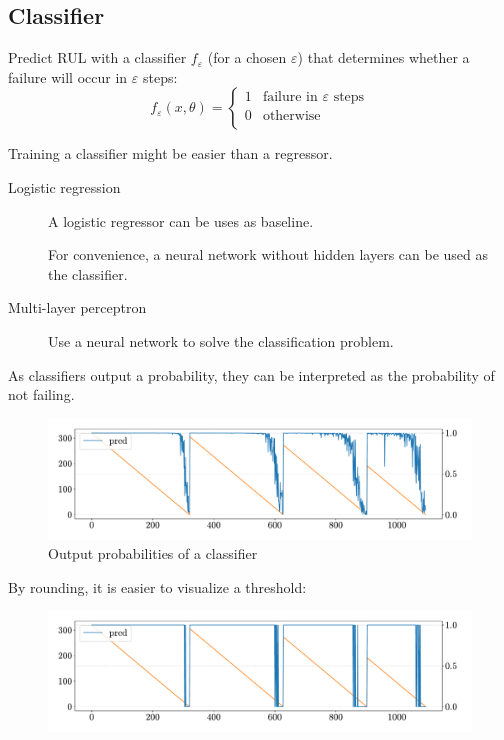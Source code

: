 \subsection{Classifier}

Predict RUL with a classifier $f_\varepsilon$ (for a chosen $\varepsilon$) that determines whether a failure will occur in $\varepsilon$ steps:
\[ f_\varepsilon(x, \theta) = \begin{cases}
    1 & \text{failure in $\varepsilon$ steps} \\
    0 & \text{otherwise} \\
\end{cases} \]

\begin{remark}
    Training a classifier might be easier than a regressor.
\end{remark}

\begin{description}
    \item[Logistic regression] 
        A logistic regressor can be uses as baseline.

        \begin{remark}
            For convenience, a neural network without hidden layers can be used as the classifier.
        \end{remark}

    \item[Multi-layer perceptron]
        Use a neural network to solve the classification problem.
\end{description}

\begin{remark}
    As classifiers output a probability, they can be interpreted as the probability of not failing.
    \begin{figure}[H]
        \centering
        \includegraphics[width=0.7\linewidth]{./img/_rul_classification_predictions.pdf}
        \caption{Output probabilities of a classifier}
    \end{figure}
    By rounding, it is easier to visualize a threshold:
    \begin{figure}[H]
        \centering
        \includegraphics[width=0.7\linewidth]{./img/_rul_classification_rounding.pdf}
    \end{figure}
\end{remark}

